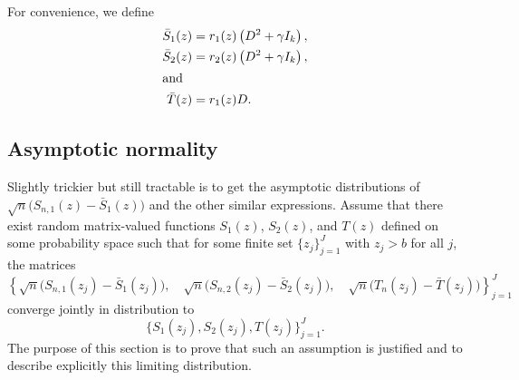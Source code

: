 For convenience, we define
\begin{align*}
    \bar S_1(z) &= r_1(z) \left( D^2 + \gamma I_k \right), \\
    \bar S_2(z) &= r_2(z) \left( D^2 + \gamma I_k \right), \\
\intertext{and}
    \bar T(z) &= r_1(z) D.
\end{align*}

\subsection{Asymptotic normality}

Slightly trickier but still tractable is to get the asymptotic distributions
of $\sqrt{n} \big( S_{n,1}(z) - \bar S_1 (z) \big)$ and the other similar expressions.
Assume that there exist random matrix-valued functions 
$S_1(z)$, $S_2(z)$, and $T(z)$ defined on some probability space
such that for some finite set $\{ z_j \}_{j=1}^J$ with $z_j > b$ for all $j$, 
the matrices
\begin{equation*}
    \left\{ 
        \sqrt{n} \big( S_{n,1}(z_j) - \bar S_1 (z_j) \big), \quad
        \sqrt{n} \big( S_{n,2}(z_j) - \bar S_2 (z_j) \big), \quad
        \sqrt{n} \big( T_n(z_j) - \bar T (z_j) \big) 
    \right\}_{j=1}^{J}
\end{equation*}
converge jointly in distribution to
\[
    \Big\{
        S_1(z_j), S_2(z_j), T(z_j)
    \Big\}_{j=1}^{J}.
\]
The purpose of this section is to prove that such an assumption is justified
and to describe explicitly this limiting distribution. 


